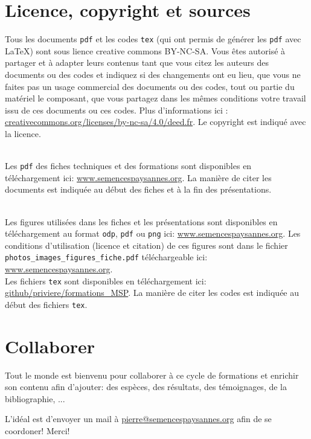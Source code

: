 \section{Licence, copyright et sources}

Tous les documents \texttt{pdf} et les codes \texttt{tex} (qui ont permis de générer les \texttt{pdf} avec \LaTeX) sont sous lience creative commons BY-NC-SA. 
Vous êtes autorisé à partager et à adapter leurs contenus tant que vous citez les auteurs des documents ou des codes et indiquez si des changements ont eu lieu, que vous ne faites pas un usage commercial des documents ou des codes, tout ou partie du matériel le composant, que vous partagez dans les mêmes conditions votre travail issu de ces documents ou ces codes. 
Plus d'informations ici : \url{creativecommons.org/licenses/by-nc-sa/4.0/deed.fr}.
Le copyright est indiqué avec la licence.

~\\

Les \texttt{pdf} des fiches techniques et des formations sont disponibles en téléchargement ici: \url{www.semencespaysannes.org}.
La manière de citer les documents est indiquée au début des fiches et à la fin des présentations.

~\\

Les figures utilisées dans les fiches et les présentations sont disponibles en téléchargement au format \texttt{odp}, \texttt{pdf} ou \texttt{png} ici: \url{www.semencespaysannes.org}.
Les conditions d'utilisation (licence et citation) de ces figures sont dans le fichier \texttt{photos\_images\_figures\_fiche.pdf} téléchargeable ici:  \url{www.semencespaysannes.org}.
~\\

Les fichiers \texttt{tex} sont disponibles en téléchargement ici: \url{github/priviere/formations_MSP}.
La manière de citer les codes est indiquée au début des fichiers \texttt{tex}.

\section{Collaborer}
Tout le monde est bienvenu pour collaborer à ce cycle de formations et enrichir son contenu afin d'ajouter: 
des espèces,
des résultats,
des témoignages,
de la bibliographie, ...

L'idéal est d'envoyer un mail à \href{mailto:pierre@semencespaysannes.org}{\textcolor{mln-green} {pierre@semencespaysannes.org}} afin de se coordoner! Merci!
